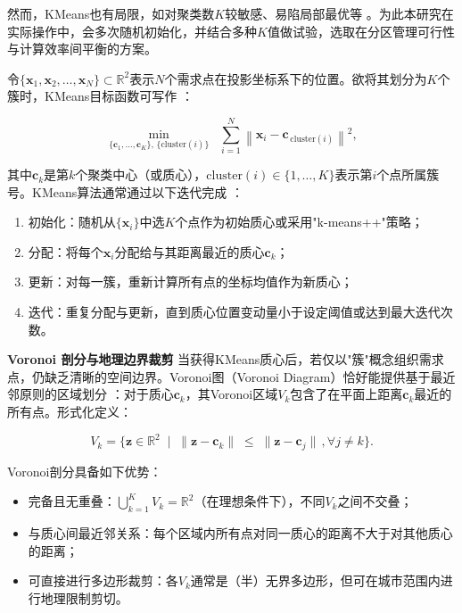 \documentclass[12pt,a4paper,twoside]{ctexbook}
\begin{document}
然而，KMeans也有局限，如对聚类数$K$较敏感、易陷局部最优等 \cite{Kaufman2009}。为此本研究在实际操作中，会多次随机初始化，并结合多种$K$值做试验，选取在分区管理可行性与计算效率间平衡的方案。

令$\{\mathbf{x}_1,\mathbf{x}_2,\dots,\mathbf{x}_N\}\subset \mathbb{R}^2$表示$N$个需求点在投影坐标系下的位置。欲将其划分为$K$个簇时，KMeans目标函数可写作 \cite{Bishop2006}：

\begin{equation}
\min_{\{\mathbf{c}_1,\dots,\mathbf{c}_K\},\,\{\mathrm{cluster}(i)\}} \;\; \sum_{i=1}^{N} \left\| \mathbf{x}_i - \mathbf{c}_{\,\mathrm{cluster}(i)}\right\|^2,
\end{equation}

其中$\mathbf{c}_k$是第$k$个聚类中心（或质心），$\mathrm{cluster}(i)\in \{1,\dots,K\}$表示第$i$个点所属簇号。KMeans算法通常通过以下迭代完成 \cite{Arthur2007}：

\begin{enumerate}
    \item 初始化：随机从$\{\mathbf{x}_i\}$中选$K$个点作为初始质心或采用"k-means++"策略；
    \item 分配：将每个$\mathbf{x}_i$分配给与其距离最近的质心$\mathbf{c}_k$；
    \item 更新：对每一簇，重新计算所有点的坐标均值作为新质心；
    \item 迭代：重复分配与更新，直到质心位置变动量小于设定阈值或达到最大迭代次数。
\end{enumerate}

\textbf{Voronoi 剖分与地理边界裁剪}
当获得KMeans质心后，若仅以"簇"概念组织需求点，仍缺乏清晰的空间边界。Voronoi图（Voronoi Diagram）恰好能提供基于最近邻原则的区域划分 \cite{Aurenhammer1991}：对于质心$\mathbf{c}_k$，其Voronoi区域$V_k$包含了在平面上距离$\mathbf{c}_k$最近的所有点。形式化定义：

\begin{equation}
V_k = \bigl\{\mathbf{z} \in \mathbb{R}^2\;\mid\; \|\mathbf{z}-\mathbf{c}_k\|\;\le\;\|\mathbf{z}-\mathbf{c}_j\|\,, \forall j \neq k \bigr\}.
\end{equation}

Voronoi剖分具备如下优势：
\begin{itemize}
    \item 完备且无重叠：$\bigcup_{k=1}^K V_k = \mathbb{R}^2$（在理想条件下），不同$V_k$之间不交叠；
    \item 与质心间最近邻关系：每个区域内所有点对同一质心的距离不大于对其他质心的距离；
    \item 可直接进行多边形裁剪：各$V_k$通常是（半）无界多边形，但可在城市范围内进行地理限制剪切。
\end{itemize}
\end{document}
